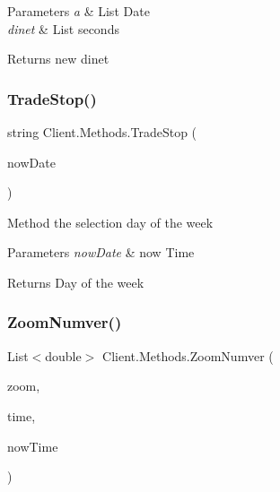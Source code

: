 \begin{DoxyParams}{Parameters}
{\em a} & List Date\\
\hline
{\em dinet} & List seconds\\
\hline
\end{DoxyParams}
\begin{DoxyReturn}{Returns}
new dinet 
\end{DoxyReturn}
\hypertarget{class_client_1_1_methods_abfda303aca077764dcc2f835566a40b5}{}\label{class_client_1_1_methods_abfda303aca077764dcc2f835566a40b5} 
\subsubsection{\texorpdfstring{Trade\+Stop()}{TradeStop()}}
{\footnotesize\ttfamily string Client.\+Methods.\+Trade\+Stop (\begin{DoxyParamCaption}\item[{Date\+Time}]{now\+Date }\end{DoxyParamCaption})\hspace{0.3cm}{\ttfamily [inline]}}



Method the selection day of the week 


\begin{DoxyParams}{Parameters}
{\em now\+Date} & now Time\\
\hline
\end{DoxyParams}
\begin{DoxyReturn}{Returns}
Day of the week
\end{DoxyReturn}
\hypertarget{class_client_1_1_methods_a9c48f83ba6d1f2f7b06b33238ab303ee}{}\label{class_client_1_1_methods_a9c48f83ba6d1f2f7b06b33238ab303ee} 
\subsubsection{\texorpdfstring{Zoom\+Numver()}{ZoomNumver()}}
{\footnotesize\ttfamily List$<$double$>$ Client.\+Methods.\+Zoom\+Numver (\begin{DoxyParamCaption}\item[{int}]{zoom,  }\item[{List$<$ double $>$}]{time,  }\item[{double}]{now\+Time }\end{DoxyParamCaption})\hspace{0.3cm}{\ttfamily [inline]}}



